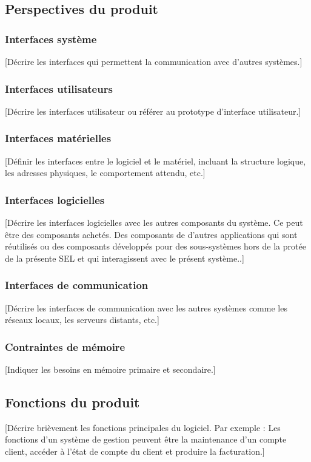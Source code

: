 \documentclass[10pt,a4paper]{report}
\begin{document}
\subsection{Perspectives du produit}

\subsubsection{Interfaces système}
[Décrire les interfaces qui permettent la communication avec d’autres systèmes.]

\subsubsection{Interfaces utilisateurs}
[Décrire les interfaces utilisateur ou référer au prototype d’interface utilisateur.]

\subsubsection{Interfaces matérielles}
[Définir les interfaces entre le logiciel et le matériel, incluant la structure logique, les adresses physiques, le comportement attendu, etc.]

\subsubsection{Interfaces logicielles}
[Décrire les interfaces logicielles avec les autres composants du système. Ce peut être des composants achetés. Des composants de d’autres applications qui sont réutilisés ou des composants développés pour des sous-systèmes hors de la protée de la présente SEL et qui interagissent avec le présent système..]

\subsubsection{Interfaces de communication}
[Décrire les interfaces de communication avec les autres systèmes comme les réseaux locaux, les serveurs distants, etc.]

\subsubsection{Contraintes de mémoire}
[Indiquer les besoins en mémoire primaire et secondaire.]

\subsection{Fonctions du produit}
[Décrire brièvement les fonctions principales du logiciel. Par exemple :
Les fonctions d’un système de gestion peuvent être la maintenance d’un compte client, accéder à l’état de compte du client et produire la facturation.]
\end{document}
